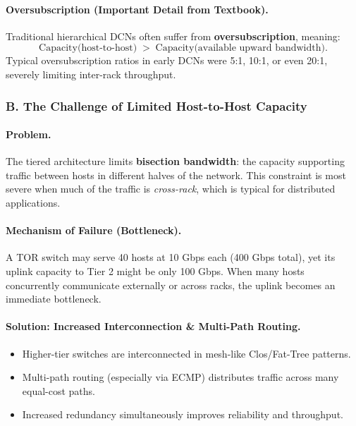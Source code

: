 \documentclass[12pt]{article}
\begin{document}
\paragraph*{Oversubscription (Important Detail from Textbook).}
Traditional hierarchical DCNs often suffer from \textbf{oversubscription}, meaning:
\[
    \text{Capacity(host-to-host)} \; > \; \text{Capacity(available upward bandwidth)}.
\]
Typical oversubscription ratios in early DCNs were 5:1, 10:1, or even 20:1, severely limiting inter-rack throughput.


\subsubsection{B. The Challenge of Limited Host-to-Host Capacity}

\paragraph*{Problem.}
\cite{13778} The tiered architecture limits \textbf{bisection bandwidth}: the capacity supporting traffic between hosts in different halves of the network. This constraint is most severe when much of the traffic is \emph{cross-rack}, which is typical for distributed applications.

\paragraph*{Mechanism of Failure (Bottleneck).}
\cite{13778} A TOR switch may serve 40 hosts at 10 Gbps each (400 Gbps total), yet its uplink capacity to Tier 2 might be only 100 Gbps. When many hosts concurrently communicate externally or across racks, the uplink becomes an immediate bottleneck.

\paragraph*{Solution: Increased Interconnection \& Multi-Path Routing.}
\begin{itemize}
    \item Higher-tier switches are interconnected in mesh-like Clos/Fat-Tree patterns.
    \item \cite{13778,13779} Multi-path routing (especially via ECMP) distributes traffic across many equal-cost paths.
    \item \cite{13778} Increased redundancy simultaneously improves reliability and throughput.
\end{itemize}
\end{document}
